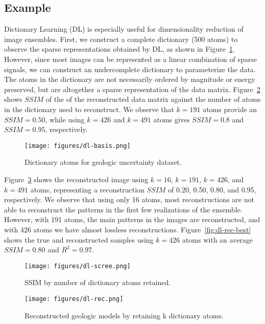 \documentclass[a4paper,fleqn,12pt]{article}
\begin{document}
\subsection*{Example}
Dictionary Learning (DL) is especially useful for dimensionality reduction of image ensembles. First, we construct a complete dictionary (500 atoms) to observe the sparse representations obtained by DL, as shown in Figure~\ref{fig:dl-basis}. However, since most images can be represented as a linear combination of sparse signals, we can construct an undercomplete dictionary to parameterize the data. The atoms in the dictionary are not necessarily ordered by magnitude or energy preserved, but are altogether a sparse representation of the data matrix. Figure~\ref{fig:dl-scree} shows $SSIM$ of the of the reconstructed data matrix against the number of atoms in the dictionary used to reconstruct. We observe that $k=191$ atoms provide an $SSIM=0.50$, while using $k=426$ and $k=491$ atoms gives $SSIM=0.8$ and $SSIM=0.95$, respectively.

\begin{figure}[H]
    \centering
    \texttt{[image: figures/dl-basis.png]}
    \caption{Dictionary atoms for geologic uncertainty dataset.}
    \label{fig:dl-basis}
\end{figure}

Figure~\ref{fig:dl-rec} shows the reconstructed image using $k=16$, $k=191$, $k=426$, and $k=491$ atoms, representing a reconstruction $SSIM$ of 0.20, 0.50, 0.80, and 0.95, respectively. We observe that using only 16 atoms, most reconstructions are not able to reconstruct the patterns in the first few realizations of the ensemble. However, with 191 atoms, the main patterns in the images are reconstructed, and with 426 atoms we have almost lossless reconstructions. Figure~\ref{fig:dl-rec-best} shows the true and reconstructed samples using $k=426$ atoms with an average $SSIM=0.80$ and $R^2=0.97$.

\begin{figure}[H]
    \centering
    \texttt{[image: figures/dl-scree.png]}
    \caption{SSIM by number of dictionary atoms retained.}
    \label{fig:dl-scree}
\end{figure}

\begin{figure}[H]
    \centering
    \texttt{[image: figures/dl-rec.png]}
    \caption{Reconstructed geologic models by retaining k dictionary atoms.}
    \label{fig:dl-rec}
\end{figure}
\end{document}
